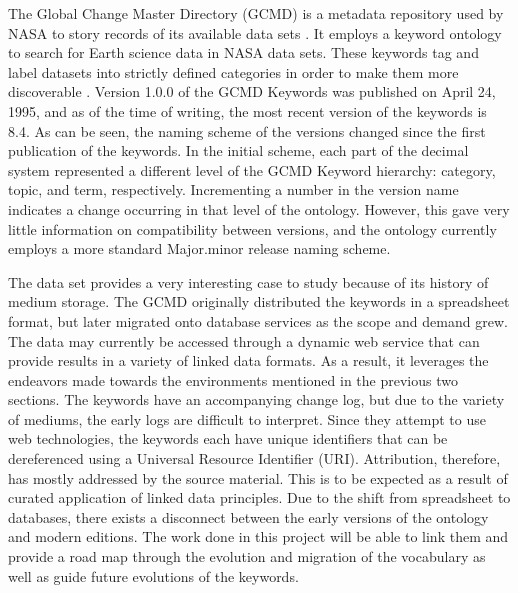 The Global Change Master Directory (GCMD) is a metadata repository used by NASA to story records of its available data sets \cite{Miled:2001:GCM:372202.372324}.
It employs a keyword ontology to search for Earth science data in NASA data sets.
These keywords tag and label datasets into strictly defined categories in order to make them more discoverable \cite{GCMDKey}.
Version 1.0.0 of the GCMD Keywords was published on April 24, 1995, and as of the time of writing, the most recent version of the keywords is 8.4.
As can be seen, the naming scheme of the versions changed since the first publication of the keywords.
In the initial scheme, each part of the decimal system represented a different level of the GCMD Keyword hierarchy: category, topic, and term, respectively.
Incrementing a number in the version name indicates a change occurring in that level of the ontology.
However, this gave very little information on compatibility between versions, and the ontology currently employs a more standard Major.minor release naming scheme.

The data set provides a very interesting case to study because of its history of medium storage.
The GCMD originally distributed the keywords in a spreadsheet format, but later migrated onto database services as the scope and demand grew.
The data may currently be accessed through a dynamic web service that can provide results in a variety of linked data formats.
As a result, it leverages the endeavors made towards the environments mentioned in the previous two sections.
The keywords have an accompanying change log, but due to the variety of mediums, the early logs are difficult to interpret.
Since they attempt to use web technologies, the keywords each have unique identifiers that can be dereferenced using a Universal Resource Identifier (URI).
Attribution, therefore, has mostly addressed by the source material.
This is to be expected as a result of curated application of linked data principles.
Due to the shift from spreadsheet to databases, there exists a disconnect between the early versions of the ontology and modern editions.
The work done in this project will be able to link them and provide a road map through the evolution and migration of the vocabulary as well as guide future evolutions of the keywords.


